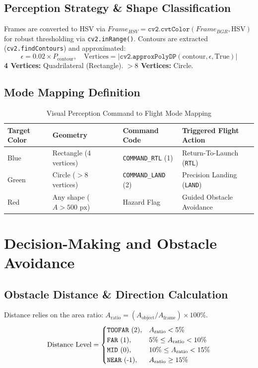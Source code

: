 \documentclass[11pt,a4paper]{article}
\begin{document}
\subsection{Perception Strategy \& Shape Classification}
Frames are converted to HSV via $Frame_{HSV} = \texttt{cv2.cvtColor}(Frame_{BGR}, \text{HSV})$ for robust thresholding via \texttt{cv2.inRange()}. Contours are extracted (\texttt{cv2.findContours}) and approximated:
\begin{equation}
\epsilon = 0.02 \times P_{\text{contour}}, \quad \text{Vertices} = |\texttt{cv2.approxPolyDP}(\text{contour}, \epsilon, \text{True})|
\end{equation}
\textbf{4 Vertices:} Quadrilateral (Rectangle). \textbf{$>8$ Vertices:} Circle.

\subsection{Mode Mapping Definition}
\begin{table}[H]
\caption{Visual Perception Command to Flight Mode Mapping}
\centering
\begin{tabular}{@{}p{1.2in}p{1.8in}p{1.4in}p{1.8in}@{}}
\hline
\rowcolor{tableheader}
\textbf{Target Color} & \textbf{Geometry} & \textbf{Command Code} & \textbf{Triggered Flight Action} \\ \hline
Blue & Rectangle (4 vertices) & \texttt{COMMAND\_RTL} (1) & Return-To-Launch (\texttt{RTL}) \\
Green & Circle ($>8$ vertices) & \texttt{COMMAND\_LAND} (2) & Precision Landing (\texttt{LAND}) \\
Red & Any shape ($A > 500\text{ px}$) & Hazard Flag & Guided Obstacle Avoidance \\ \hline
\end{tabular}
\end{table}

\section{Decision-Making and Obstacle Avoidance}

\subsection{Obstacle Distance \& Direction Calculation}
Distance relies on the area ratio: $A_{\text{ratio}} = (A_{\text{object}} / A_{\text{frame}}) \times 100\%$.
\begin{equation}
\text{Distance Level} = 
\begin{cases}
\text{\texttt{TOOFAR} (2)}, & A_{\text{ratio}} < 5\% \\
\text{\texttt{FAR} (1)}, & 5\% \le A_{\text{ratio}} < 10\% \\
\text{\texttt{MID} (0)}, & 10\% \le A_{\text{ratio}} < 15\% \\
\text{\texttt{NEAR} (-1)}, & A_{\text{ratio}} \ge 15\%
\end{cases}
\end{equation}
\end{document}

